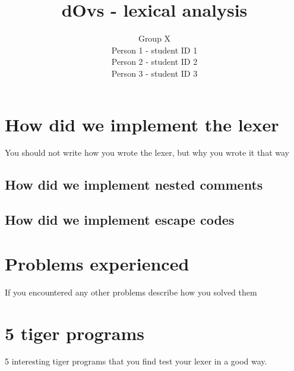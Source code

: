 \documentclass{article}
\title{dOvs - lexical analysis}
\author{
  Group X \\
  Person 1 - student ID 1\\
  Person 2 - student ID 2\\
  Person 3 - student ID 3
}
\begin{document}
\maketitle

\section{How did we implement the lexer}
You should not write how you wrote the lexer, but why you wrote it that way

\subsection{How did we implement nested comments}

\subsection{How did we implement escape codes}

\section{Problems experienced}
If you encountered any other problems describe how you solved them

\section{5 tiger programs}
5 interesting tiger programs that you find test your lexer in a good way.
\end{document}
